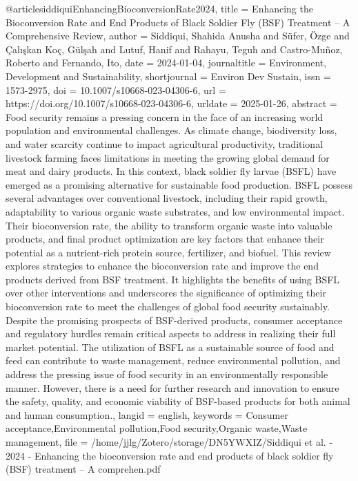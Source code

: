{{{{@article{siddiquiEnhancingBioconversionRate2024,
  title = {Enhancing the Bioconversion Rate and End Products of Black Soldier Fly ({{BSF}}) Treatment – {{A}} Comprehensive Review},
  author = {Siddiqui, Shahida Anusha and Süfer, Özge and Çalışkan Koç, Gülşah and Lutuf, Hanif and Rahayu, Teguh and Castro-Muñoz, Roberto and Fernando, Ito},
  date = {2024-01-04},
  journaltitle = {Environment, Development and Sustainability},
  shortjournal = {Environ Dev Sustain},
  issn = {1573-2975},
  doi = {10.1007/s10668-023-04306-6},
  url = {https://doi.org/10.1007/s10668-023-04306-6},
  urldate = {2025-01-26},
  abstract = {Food security remains a pressing concern in the face of an increasing world population and environmental challenges. As climate change, biodiversity loss, and water scarcity continue to impact agricultural productivity, traditional livestock farming faces limitations in meeting the growing global demand for meat and dairy products. In this context, black soldier fly larvae (BSFL) have emerged as a promising alternative for sustainable food production. BSFL possess several advantages over conventional livestock, including their rapid growth, adaptability to various organic waste substrates, and low environmental impact. Their bioconversion rate, the ability to transform organic waste into valuable products, and final product optimization are key factors that enhance their potential as a nutrient-rich protein source, fertilizer, and biofuel. This review explores strategies to enhance the bioconversion rate and improve the end products derived from BSF treatment. It highlights the benefits of using BSFL over other interventions and underscores the significance of optimizing their bioconversion rate to meet the challenges of global food security sustainably. Despite the promising prospects of BSF-derived products, consumer acceptance and regulatory hurdles remain critical aspects to address in realizing their full market potential. The utilization of BSFL as a sustainable source of food and feed can contribute to waste management, reduce environmental pollution, and address the pressing issue of food security in an environmentally responsible manner. However, there is a need for further research and innovation to ensure the safety, quality, and economic viability of BSF-based products for both animal and human consumption.},
  langid = {english},
  keywords = {Consumer acceptance,Environmental pollution,Food security,Organic waste,Waste management},
  file = {/home/jjlg/Zotero/storage/DN5YWXIZ/Siddiqui et al. - 2024 - Enhancing the bioconversion rate and end products of black soldier fly (BSF) treatment – A comprehen.pdf}
}

}}}}
